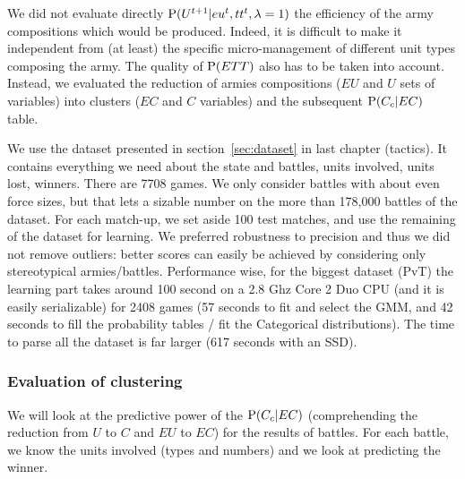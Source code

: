We did not evaluate directly $\mathrm{P}(U^{t+1}|eu^t,tt^t,\lambda=1)$ the efficiency of the army compositions which would be produced. Indeed, it is difficult to make it independent from (at least) the specific micro-management of different unit types composing the army. The quality of $\mathrm{P}(ETT)$ also has to be taken into account. Instead, we evaluated the reduction of armies compositions ($EU$ and $U$ sets of variables) into clusters ($EC$ and $C$ variables) and the subsequent $\mathrm{P}(C_c | EC)$ table. 

We use the dataset presented in section~\ref{sec:dataset} in last chapter (tactics). It contains everything we need about the state and battles, units involved, units lost, winners. There are 7708 games. We only consider battles with about even force sizes, but that lets a sizable number on the more than 178,000 battles of the dataset. 
For each match-up, we set aside 100 test matches, and use the remaining of the dataset for learning. 
We preferred robustness to precision and thus we did not remove outliers: better scores can easily be achieved by considering only stereotypical armies/battles. %
Performance wise, for the biggest dataset (PvT) the learning part takes around 100 second on a 2.8 Ghz Core 2 Duo CPU (and it is easily serializable) for 2408 games (57 seconds to fit and select the GMM, and 42 seconds to fill the probability tables / fit the Categorical distributions). The time to parse all the dataset is far larger (617 seconds with an SSD). %

\subsubsection{Evaluation of clustering}

We will look at the predictive power of the $\mathrm{P}(C_c | EC)$ (comprehending the reduction from $U$ to $C$ and $EU$ to $EC$) for the results of battles. For each battle, we know the units involved (types and numbers) and we look at predicting the winner.

